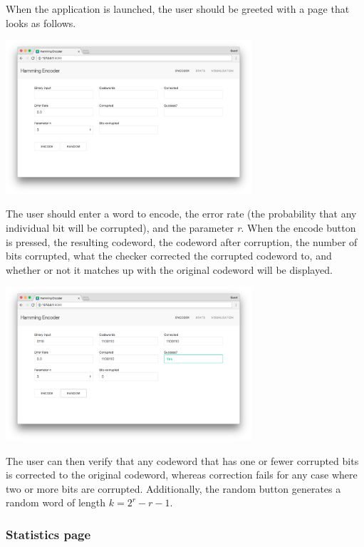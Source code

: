 \documentclass[11pt, oneside]{article}   	%
\begin{document}
When the application is launched, the user should be greeted with a page that looks as follows.

\begin{center}
\includegraphics[width=345px]{main_blank}
\end{center}

The user should enter a word to encode, the error rate (the probability that any individual bit will be corrupted), and the parameter \textit{r}. When the encode button is pressed, the resulting codeword, the codeword after corruption, the number of bits corrupted, what the checker corrected the corrupted codeword to, and whether or not it matches up with the original codeword will be displayed. 

\begin{center}
\includegraphics[width=345px]{main_code}
\end{center}

The user can then verify that any codeword that has one or fewer corrupted bits is corrected to the original codeword, whereas correction fails for any case where two or more bits are corrupted. Additionally, the random button generates a random word of length $k = 2^r - r - 1$. 

\subsubsection*{Statistics page}
\end{document}
